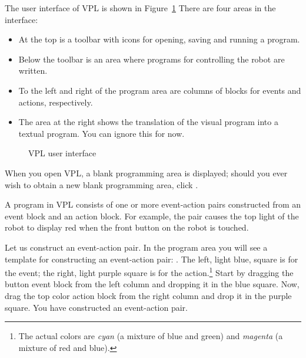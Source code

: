 \clearpage


The user interface of VPL is shown in Figure~\ref{fig.gui}
There are four areas in the interface:

\begin{itemize}
\item At the top is a toolbar with icons for opening, saving and running
a program. 
\item Below the toolbar is an area where programs for controlling
the robot are written.
\item To the left and right of the program area are columns of blocks
for events and actions, respectively.
\item The area at the right shows the translation of the visual
program into a textual program. You can ignore this for now.
\end{itemize}

\begin{figure}[hbt]
\caption{VPL user interface}\label{fig.gui}
\end{figure}



When you open VPL, a blank programming area is displayed; should you
ever wish to obtain a new blank programming area, click .

A program in VPL consists of one or more event-action pairs constructed
from an event block and an action block. For example, the pair
 causes the top light of the robot to display red when the
front button on the robot is touched.


Let us construct an event-action pair. In the program area you will see
a template for constructing an event-action pair:
. The left, light blue, square is for the
event; the right, light purple square is for the action.\footnote{The
actual colors are \textit{cyan} (a mixture of blue and green) and
\textit{magenta} (a mixture of red and blue).} Start by dragging the
button event block  from the left column and dropping
it in the blue square. Now, drag the top color action block
 from the right column and drop it in the purple
square. You have constructed an event-action pair.

